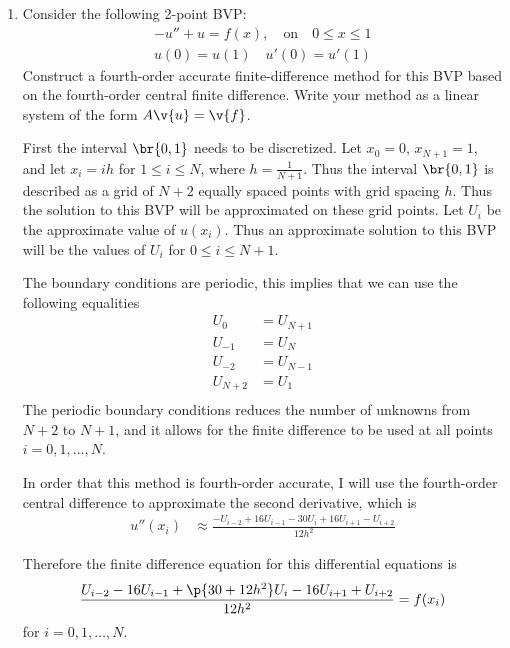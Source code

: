 \documentclass[11pt, oneside]{article}
\begin{document}
\begin{enumerate}
    \item %
        Consider the following 2-point BVP:
        \begin{align*}
            -u'' + u = f(x), \quad \text{on} \quad 0 \le x \le 1 \\
            u(0) = u(1) \quad u'(0) = u'(1)
        \end{align*}
        Construct a fourth-order accurate finite-difference method for this BVP
        based on the fourth-order central finite difference.
        Write your method as a linear system of the form $A\v{u} = \v{f}$.

        First the interval $\br{0, 1}$ needs to be discretized.
        Let $x_0 = 0$, $x_{N + 1} = 1$, and let $x_{i} = ih$ for $1 \le i \le N$,
        where $h = \frac{1}{N+1}$.
        Thus the interval $\br{0, 1}$ is described as a grid of $N+2$ equally
        spaced points with grid spacing $h$.
        Thus the solution to this BVP will be approximated on these grid points.
        Let $U_i$ be the approximate value of $u(x_i)$.
        Thus an approximate solution to this BVP will be the values of $U_i$ for
        $0 \le i \le N+1$.

        The boundary conditions are periodic, this implies that we can use the
        following equalities
        \begin{align*}
            U_0 &= U_{N+1} \\
            U_{-1} &= U_{N} \\
            U_{-2} &= U_{N-1} \\
            U_{N+2} &= U_1 \\
        \end{align*}
        The periodic boundary conditions reduces the number of unknowns from
        $N+2$ to $N+1$, and it allows for the finite difference to be
        used at all points $i = 0, 1, \ldots, N$.

        In order that this method is fourth-order accurate, I will use the
        fourth-order central difference to approximate the second derivative,
        which is
        \begin{align*}
            u''(x_i) &\approx \frac{-U_{i-2} + 16U_{i-1} - 30U_i + 16U_{i+1} - U_{i+2}}{12h^2}
        \end{align*}

        Therefore the finite difference equation for this differential equations
        is
        \begin{align*}
            \frac{U_{i-2} - 16U_{i-1} + \p{30 + 12h^2}U_i - 16U_{i+1} + U_{i+2}}{12h^2} = f(x_i)
        \end{align*}
        for $i = 0, 1, \ldots, N$.


\end{enumerate}
\end{document}
